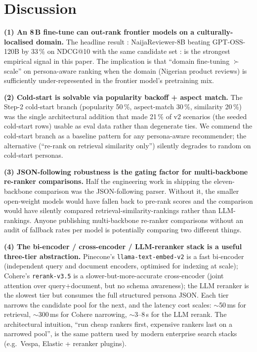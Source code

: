 \documentclass[sigconf,nonacm,balance]{acmart}
\begin{document}
\section{Discussion}
\label{sec:discussion}

\textbf{(1) An 8\,B fine-tune can out-rank frontier models on a culturally-localised
domain.} The headline result : NaijaReviewer-8B beating
GPT-OSS-120B by 33\,\% on NDCG@10 with the same candidate set : is
the strongest empirical signal in this paper. The implication is that
``domain fine-tuning $\succ$ scale'' on persona-aware ranking when
the domain (Nigerian product reviews) is sufficiently under-represented
in the frontier model's pretraining mix.

\textbf{(2) Cold-start is solvable via popularity backoff + aspect match.}
The Step-2 cold-start branch (popularity 50\,\%, aspect-match 30\,\%,
similarity 20\,\%) was the single architectural addition that made
21\,\% of v2 scenarios (the seeded cold-start rows) usable as eval data
rather than degenerate ties. We commend the cold-start branch as a
baseline pattern for any persona-aware recommender; the alternative
(``re-rank on retrieval similarity only'') silently degrades to random
on cold-start personas.

\textbf{(3) JSON-following robustness is the gating factor for multi-backbone
re-ranker comparisons.} Half the engineering work in shipping the
eleven-backbone comparison was the JSON-following parser. Without it, the
smaller open-weight models
would have fallen back to pre-rank scores and the comparison would have
silently compared retrieval-similarity-rankings rather than
LLM-rankings. Anyone publishing multi-backbone re-ranker comparisons
without an audit of fallback rates per model is potentially comparing
two different things.

\textbf{(4) The bi-encoder / cross-encoder / LLM-reranker stack is
a useful three-tier abstraction.} Pinecone's
\texttt{llama-text-embed-v2} is a fast bi-encoder (independent query
and document encoders, optimised for indexing at scale); Cohere's
\texttt{rerank-v3.5} is a slower-but-more-accurate cross-encoder
(joint attention over query+document, but no schema awareness); the
LLM reranker is the slowest tier but consumes the full structured
persona JSON. Each tier narrows the candidate pool for the next, and
the latency cost scales: $\sim$50\,ms for retrieval, $\sim$300\,ms
for Cohere narrowing, $\sim$3--8\,s for the LLM rerank. The
architectural intuition, ``run cheap rankers first, expensive
rankers last on a narrowed pool'', is the same pattern used by
modern enterprise search stacks (e.g.\ Vespa, Elastic + reranker
plugins).
\end{document}
